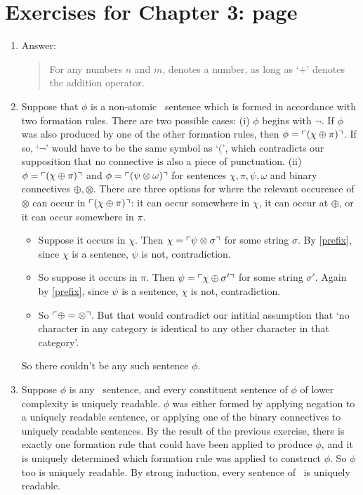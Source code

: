 {\section*{Exercises for Chapter 3: page \pageref{ex3}} \label{ans3}

\begin{enumerate}
	\item Answer: \begin{quote}
		For any numbers $n$ and $m$,  denotes a number, as long as `$+$' denotes the addition operator.
	\end{quote} \setcounter{enumi}{2}
	\item Suppose that $\phi$ is a non-atomic \lone\ sentence which is formed in accordance with two formation rules. There are two possible cases: (i) $\phi$ begins with $\neg$. If $\phi$ was also produced by one of the other formation rules, then $\phi = \ulcorner (\chi\oplus\pi) \urcorner$. If so, `$\neg$' would have to be the same symbol as `$($', which contradicts our supposition that no connective is also a piece of punctuation. (ii) $\phi = \ulcorner (\chi\oplus\pi) \urcorner$  and $\phi = \ulcorner (\psi\otimes\omega) \urcorner$ for sentences $\chi,\pi,\psi,\omega$ and binary connectives $\oplus,\otimes$. There are three options for where the relevant occurence of $\otimes$ can occur in $\ulcorner (\chi\oplus\pi) \urcorner$: it can occur somewhere in $\chi$, it can occur at $\oplus$, or it can occur somewhere in $\pi$. \begin{itemize}
		\item Suppose it occurs in $\chi$. Then $\chi = \ulcorner \psi\otimes\sigma \urcorner$ for some string $\sigma$. By \autoref{prefix}, since $\chi$ is a sentence, $\psi$ is not, contradiction. 

\item So suppose it occurs in $\pi$. Then $\psi = \ulcorner \chi\oplus\sigma' \urcorner$ for some string $\sigma'$. Again by \autoref{prefix}, since $\psi$ is a sentence, $\chi$ is not, contradiction.
\item So $\ulcorner \oplus=\otimes \urcorner$. But that would contradict our intitial assumption that `no character in any category is identical to any other character in that category'. 
	\end{itemize}
So there couldn't be any such sentence $\phi$.
\item Suppose $\phi$ is any \lone\ sentence, and every constituent sentence of $\phi$ of lower complexity is uniquely readable. $\phi$ was either formed by applying negation to a uniquely readable sentence, or applying one of the binary connectives to uniquely readable sentences. By the result of the previous exercise, there is exactly one formation rule that could have been applied to produce $\phi$, and it is uniquely determined which formation rule was applied to construct $\phi$. So $\phi$ too is uniquely readable.  By strong induction, every sentence of \lone\ is uniquely readable.
		
	\end{enumerate}





}